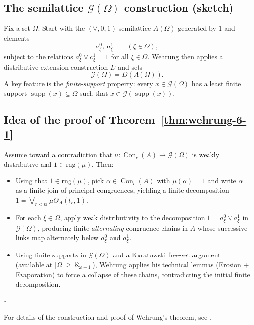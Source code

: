 ﻿\documentclass{article}
\begin{document}
\subsection*{The semilattice $\mathcal{G}(\Omega)$ construction (sketch)}
Fix a set $\Omega$.
Start with the $(\vee,0,1)$-semilattice $A(\Omega)$ generated by $1$ and elements
\[
a^0_\xi,\ a^1_\xi \qquad (\xi\in\Omega),
\]
subject to the relations $a^0_\xi\vee a^1_\xi=1$ for all $\xi\in\Omega$.
Wehrung then applies a distributive extension construction $D$ and sets
\[
\mathcal{G}(\Omega)=D(A(\Omega)).
\]
A key feature is the \emph{finite-support} property: every $x\in \mathcal{G}(\Omega)$ has a least finite support
$\operatorname{supp}(x)\subseteq\Omega$ such that $x\in \mathcal{G}(\operatorname{supp}(x))$.

\subsection*{Idea of the proof of Theorem~\ref{thm:wehrung-6-1}}
Assume toward a contradiction that $\mu:\operatorname{Con}_c(A)\to \mathcal{G}(\Omega)$ is weakly distributive and $1\in\mathrm{rng}(\mu)$.
Then:
\begin{itemize}
\item Using that $1\in\mathrm{rng}(\mu)$, pick $\alpha\in\operatorname{Con}_c(A)$ with $\mu(\alpha)=1$ and write
$\alpha$ as a finite join of principal congruences, yielding a finite decomposition
$1=\bigvee_{r<m}\mu\Theta_A(t_r,1)$.
\item For each $\xi\in\Omega$, apply weak distributivity to the decomposition $1=a^0_\xi\vee a^1_\xi$ in $\mathcal{G}(\Omega)$,
producing finite \emph{alternating} congruence chains in $A$ whose successive links map alternately below $a^0_\xi$ and $a^1_\xi$.
\item Using finite supports in $\mathcal{G}(\Omega)$ and a Kuratowski free-set argument (available at
$|\Omega|\ge\aleph_{\omega+1}$), Wehrung applies his technical lemmas (Erosion + Evaporation)
to force a collapse of these chains, contradicting the initial finite decomposition.
\end{itemize}

\hfill$\square$

For details of the construction and proof of Wehrung's theorem, see \cite[Theorem~6.1, p.~619]{Wehrung2007AdvMath}.
\end{document}
